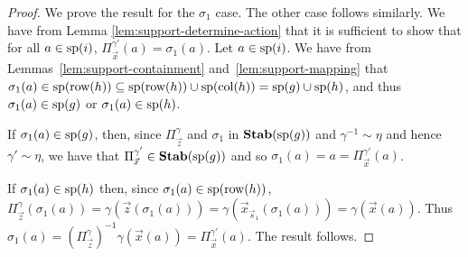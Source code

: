 \documentclass[../paper.tex]{subfiles}
\begin{document}
\begin{proof}

  We prove the result for the $\sigma_1$ case. The other case follows similarly.
  We have from Lemma \ref{lem:support-determine-action} that it is sufficient to
  show that for all $a \in \text{sp}(i)$, $\Pi^{\gamma'}_{\vec{x}} (a) = \sigma_1
  (a)$. Let $a \in \text{sp}(i)$. We have from Lemmas~\ref{lem:support-containment}
  and~\ref{lem:support-mapping} that $\sigma_1 (a) \in \text{sp}(\text{row}(h)) \subseteq
  \text{sp}(\text{row}(h))\cup \text{sp}(\text{col}(h)) = \text{sp}(g) \cup \text{sp}(h)$, and thus
  $\sigma_1(a) \in \text{sp}(g)$ or $\sigma_1(a) \in \text{sp}(h)$.
  
  If $\sigma_1(a) \in \text{sp}(g)$, then, since $\Pi^{\gamma}_{\vec{z}}$ and
  $\sigma_1$ in $\text{\textbf{Stab}} (\text{sp} (g))$ and $\gamma^{-1} \sim \eta$ and hence $\gamma' \sim
  \eta$, we have that $\Pi^{\gamma'}_{\vec{x}} \in \text{\textbf{Stab}} (\text{sp} (g))$ and so
  $\sigma_1(a) = a = \Pi^{\gamma'}_{\vec{x}}(a)$.

  If $\sigma_1(a) \in \text{sp}(h)$ then, since $\sigma_1(a) \in \text{sp}(\text{row}(h))$,
  $\Pi^{\gamma}_{\vec{z}}(\sigma_1(a)) = \gamma(\vec{z}(\sigma_1(a))) =
  \gamma(\vec{x}_{\vec{s}_1}(\sigma_1(a))) = \gamma (\vec{x}(a))$. Thus
  $\sigma_1 (a) = (\Pi^{\gamma}_{\vec{z}})^{-1}\gamma (\vec{x}(a)) =
  \Pi^{\gamma'}_{\vec{x}}(a)$. The result follows.
  


\end{proof}
\end{document}
